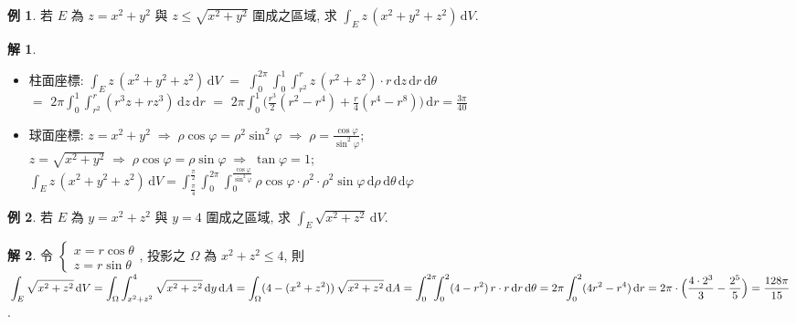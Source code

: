 \documentclass[12pt]{extarticle}
\newcommand{\ds}{\displaystyle}
\newcommand{\ie}{\;\Longrightarrow\;}
\theoremstyle{definition}
\newtheorem*{ex}{例}
\newtheorem*{sol}{解}
\begin{document}
\begin{ex}
  若 $E$ 為 $z = x^2 + y^2$ 與 $z \leqslant\sqrt{x^2 + y^2}$ 圍成之區域, 求 $\ds\int_E z\,(x^2 + y^2 + z^2)\,\text{d}V$.
\end{ex}

\begin{sol}
  \begin{minipage}{0.22\textwidth}
    \includegraphics[scale=0.95,page=76]{fig/prob.pdf} \\ 
  \end{minipage}
  \begin{minipage}{0.78\textwidth}
    \begin{itemize}
      \item 柱面座標: $\ds\int_E z\,(x^2 + y^2 + z^2)\,\text{d}V$ $=$ $\ds\int_0^{2\pi}\!\!\!\int_0^1\!\!\int_{r^2}^{r}\!z\,(r^2 + z^2)\cdot r\,\text{d}z\,\text{d}r\,\text{d}\theta$ \\$=$ $\ds 2\pi\int_0^1\!\!\int_{r^2}^{r}(r^3z + rz^3)\,\text{d}z\,\text{d}r$ $=$ $\ds 2\pi\int_0^1\Big(\frac{r^3}{2}(r^2 - r^4) + \frac{r}{4}(r^4 - r^8)\Big)\,\text{d}r = \frac{3\pi}{40}$ 
      \item 球面座標: $\ds z = x^2 + y^2 \ie \rho\cos\varphi = \rho^2\sin^2\varphi \ie \rho = \frac{\cos\varphi}{\sin^2\varphi}$; \\$\ds z = \sqrt{x^2 + y^2} \ie \rho\cos\varphi = \rho\sin\varphi \ie \tan\varphi = 1$; \\$\ds\int_E z\,(x^2 + y^2 + z^2)\,\text{d}V = \int_{\frac{\pi}{4}}^{\frac{\pi}{2}}\!\!\!\int_0^{2\pi}\!\!\!\int_0^{\frac{\cos\varphi}{\sin^2\varphi}}\!\!\rho\cos\varphi\cdot\rho^2\cdot\rho^2\sin\varphi\,\text{d}\rho\,\text{d}\theta\,\text{d}\varphi$
    \end{itemize}
  \end{minipage}
\end{sol}

\begin{ex}
  若 $E$ 為 $y = x^2 + z^2$ 與 $y = 4$ 圍成之區域, 求 $\ds\int_E \sqrt{x^2 + z^2}\,\text{d}V$.
\end{ex}

\begin{sol}
  令 $\ds\begin{cases}x = r\cos\theta \\ z = r\sin\theta \end{cases}\!\!\!\!\!$, 投影之 $\Omega$ 為 $x^2 + z^2 \leqslant 4$, 則 $\ds\int_E\sqrt{x^2 + z^2}\,\text{d}V = \int_\Omega\int_{x^2 + z^2}^4\sqrt{x^2 + z^2}\,\text{d}y\,\text{d}A \\= \int_\Omega(4 - (x^2 + z^2))\,\sqrt{x^2 + z^2}\,\text{d}A = \int_0^{2\pi}\!\!\!\int_0^2(4 - r^2)\,r\cdot r\,\text{d}r\,\text{d}\theta = 2\pi\int_0^2(4r^2 - r^4)\,\text{d}r = 2\pi\cdot\Big(\frac{4\cdot2^3}{3} - \frac{2^5}{5}\Big) = \frac{128\pi}{15}$.
\end{sol}
\end{document}
